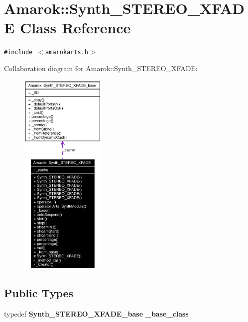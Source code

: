 \section{Amarok::Synth\_\-STEREO\_\-XFADE Class Reference}
\label{classAmarok_1_1Synth__STEREO__XFADE}
{\tt \#include $<$amarokarts.h$>$}

Collaboration diagram for Amarok::Synth\_\-STEREO\_\-XFADE:\begin{figure}[H]
\begin{center}
\leavevmode
\includegraphics[width=116pt]{classAmarok_1_1Synth__STEREO__XFADE__coll__graph}
\end{center}
\end{figure}
\subsection*{Public Types}
\begin{CompactItemize}
\item 
typedef {\bf Synth\_\-STEREO\_\-XFADE\_\-base} {\bf \_\-base\_\-class}
\end{CompactItemize}
